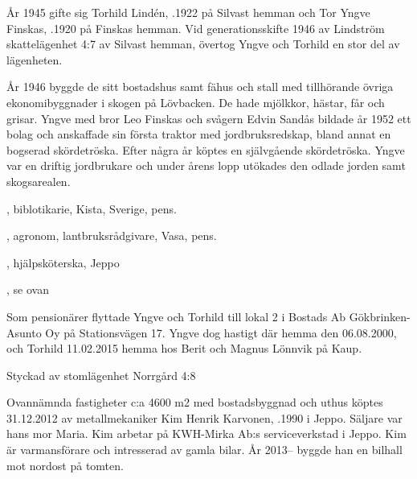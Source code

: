 År 1945 gifte sig Torhild Lindén, .1922 på Silvast hemman och Tor Yngve Finskas, .1920 på Finskas hemman. Vid generationsskifte 1946 av Lindström skattelägenhet 4:7 av Silvast hemman, övertog Yngve och Torhild en stor del av lägenheten.

År 1946 byggde de sitt bostadshus samt fähus och stall med tillhörande övriga ekonomibyggnader i skogen på Lövbacken. De hade mjölkkor, hästar, får och grisar. Yngve med bror Leo Finskas och svågern Edvin Sandås bildade år 1952 ett bolag och anskaffade sin första traktor med jordbruksredskap, bland annat en bogserad skördetröska. Efter några år köptes en självgående skördetröska. Yngve var en driftig jordbrukare och under årens lopp utökades den odlade jorden samt skogsarealen.
\begin{jhchildren}
  \item {}, biblotikarie, Kista, Sverige, pens.
  \item {}, agronom, lantbruksrådgivare, Vasa, pens.
  \item {}, hjälpsköterska, Jeppo
  \item {}, se ovan
\end{jhchildren}
Som pensionärer flyttade Yngve och Torhild till lokal 2 i Bostads Ab Gökbrinken-Asunto Oy på Stationsvägen 17. Yngve dog hastigt där hemma den 06.08.2000, och Torhild 11.02.2015 hemma hos Berit och Magnus Lönnvik på Kaup.




Styckad av stomlägenhet Norrgård 4:8


Ovannämnda fastigheter c:a 4600 m2 med bostadsbyggnad och uthus köptes 31.12.2012 av metallmekaniker Kim Henrik Karvonen, .1990 i Jeppo. Säljare var hans mor Maria. Kim arbetar på KWH-Mirka Ab:s serviceverkstad i Jeppo. Kim är varmansförare och intresserad av gamla bilar. År 2013-- byggde han en bilhall mot nordost på tomten.


